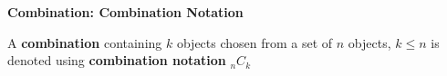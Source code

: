{\bf Combination: Combination Notation}
\vskip 6pt

A {\bf combination} containing $k$ objects chosen from a set of $n$ objects, $k\leq n$ is denoted using {\bf combination notation} ${}_nC_k$

\vfill\eject
